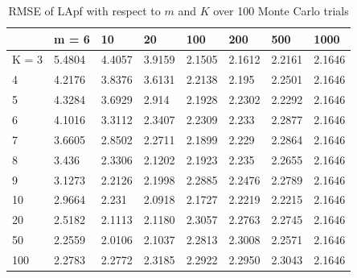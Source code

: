 \documentclass[10pt,letterpaper,final]{article}
\begin{document}
\begin{table}[h!]
\centering
\begin{tabular}{|l|l|l|l|l|l|l|l|}
\hline
        & m = 6  & 10     & 20     & 100    & 200    & 500    & 1000   \\ \hline
K = 3   & 5.4804 & 4.4057 & 3.9159 & 2.1505 & 2.1612 & 2.2161 & 2.1646 \\ \hline
4       & 4.2176 & 3.8376 & 3.6131 & 2.2138 & 2.195  & 2.2501 & 2.1646 \\ \hline
5       & 4.3284 & 3.6929 & 2.914  & 2.1928 & 2.2302 & 2.2292 & 2.1646 \\ \hline
6       & 4.1016 & 3.3112 & 2.3407 & 2.2309 & 2.233  & 2.2877 & 2.1646 \\ \hline
7       & 3.6605 & 2.8502 & 2.2711 & 2.1899 & 2.229  & 2.2864 & 2.1646 \\ \hline
8       & 3.436  & 2.3306 & 2.1202 & 2.1923 & 2.235  & 2.2655 & 2.1646 \\ \hline
9       & 3.1273 & 2.2126 & 2.1998 & 2.2885 & 2.2476 & 2.2789 & 2.1646 \\ \hline
10      & 2.9664 & 2.231  & 2.0918 & 2.1727 & 2.2219 & 2.2215 & 2.1646 \\ \hline
20      & 2.5182 & 2.1113 & 2.1180 & 2.3057 & 2.2763 & 2.2745    & 2.1646 \\ \hline
50      & 2.2559 & 2.0106 & 2.1037 & 2.2813 & 2.3008 & 2.2571    & 2.1646 \\ \hline
100     & 2.2783 & 2.2772 & 2.3185 & 2.2922 & 2.2950 & 2.3043    & 2.1646 \\ \hline
\end{tabular}
\caption{RMSE of LApf with respect to $m$ and $K$ over 100 Monte Carlo trials}
\label{tab:RMSE_LApf}
\end{table}
\end{document}
